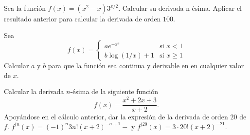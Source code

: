 {Sea la función $f(x)=(x^{2}-x)3^{x/2}.$ Calcular su derivada n-ésima. Aplicar el resultado anterior para calcular la derivada de orden $100$.
}


{Sea
\[
f(x)=
\begin{cases}
ae^{-x^2} & \mbox{si $x<1$} \\
b\log (1/x)+1 & \mbox{si $x\geq 1$}
\end{cases}
\]
Calcular $a$ y $b$ para que la función sea continua y derivable en en cualquier valor de $x$.
}


{Calcular la derivada $n$-ésima de la siguiente función
\[
f(x)= \frac{x^2+2x+3}{x+2}.
\]
Apoyándose en el cálculo anterior, dar la expresión de la derivada de orden 20 de $f$.
}
{$f^{(n}(x) = (-1)^n 3n!(x+2)^{-n+1}-$ y $f^{(20}(x) = 3\cdot 20!(x+2)^{-21}$.
}
{
}


